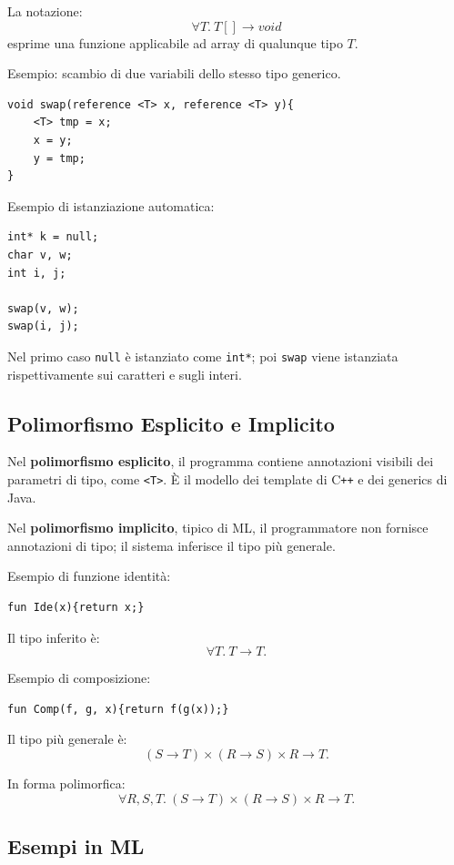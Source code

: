 \documentclass{article}
\begin{document}
La notazione:
\[
\forall T.\ T[] \to void
\]
esprime una funzione applicabile ad array di qualunque tipo $T$.

Esempio: scambio di due variabili dello stesso tipo generico.

\begin{lstlisting}
void swap(reference <T> x, reference <T> y){
    <T> tmp = x;
    x = y;
    y = tmp;
}
\end{lstlisting}

Esempio di istanziazione automatica:

\begin{lstlisting}
int* k = null;
char v, w;
int i, j;

swap(v, w);
swap(i, j);
\end{lstlisting}

Nel primo caso \texttt{null} è istanziato come \texttt{int*}; poi \texttt{swap} viene istanziata rispettivamente sui caratteri e sugli interi.

\subsection{Polimorfismo Esplicito e Implicito}

Nel \textbf{polimorfismo esplicito}, il programma contiene annotazioni visibili dei parametri di tipo, come \texttt{<T>}. È il modello dei template di C\texttt{++} e dei generics di Java.

Nel \textbf{polimorfismo implicito}, tipico di ML, il programmatore non fornisce annotazioni di tipo; il sistema inferisce il tipo più generale.

Esempio di funzione identità:

\begin{lstlisting}
fun Ide(x){return x;}
\end{lstlisting}

Il tipo inferito è:
\[
\forall T.\ T \to T.
\]

Esempio di composizione:

\begin{lstlisting}
fun Comp(f, g, x){return f(g(x));}
\end{lstlisting}

Il tipo più generale è:
\[
(S \to T) \times (R \to S) \times R \to T.
\]

In forma polimorfica:
\[
\forall R,S,T.\ (S \to T) \times (R \to S) \times R \to T.
\]

\subsection{Esempi in ML}
\end{document}
